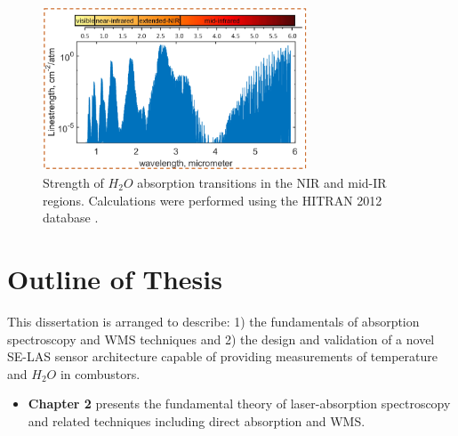 

\begin{figure}[ht]
    \centering
        \includegraphics[width=0.7\textwidth]{fig/ch1_fig7.png}
        \caption{Strength of $H_2O$ absorption transitions in the NIR and mid-IR regions. Calculations were performed using the HITRAN 2012 database \cite{2013JQSRT.130....4R}.}
    \label{fig:ch1_6}
\end{figure}

\section{Outline of Thesis}
This dissertation is arranged to describe: 1) the fundamentals of absorption spectroscopy and WMS techniques and 2) the design and validation of a novel SE-LAS sensor architecture capable of providing measurements of temperature and $H_2O$ in combustors.

\begin{itemize}
\item \textbf{Chapter 2} presents the fundamental theory of laser-absorption spectroscopy and related techniques including direct absorption and WMS. 
\end{itemize}

